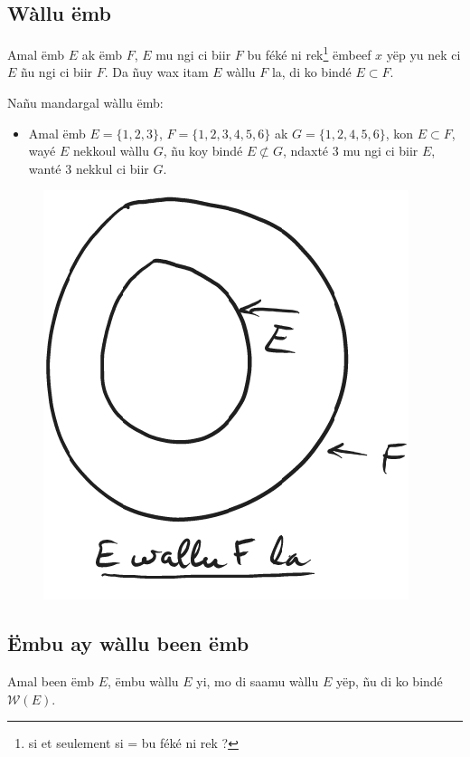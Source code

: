 \documentclass[twoside, a4paper]{article}
\begin{document}
\subsection{Wàllu ëmb}
\begin{tcolorbox}[enhanced jigsaw,breakable,pad at break*=1mm,
    colback=red!5!white,colframe=white!75!black,title= Téeki,
    watermark color=white]
  Amal ëmb $E$ ak ëmb $F$, $E$ mu ngi ci biir $F$ bu féké ni rek\footnote{si et seulement si = bu féké ni rek ?} ëmbeef $x$ yëp yu nek ci $E$ ñu ngi ci biir $F$. Da ñuy wax itam $E$ wàllu $F$ la, di ko bindé $E \subset F$.
\end{tcolorbox}

Nañu mandargal wàllu ëmb:
\begin{itemize}
  \item Amal ëmb $E=\{1,2,3\}$, $F=\{1,2,3,4,5,6\}$ ak $G = \{1,2,4,5,6\}$, kon $E \subset F$, wayé $E$ nekkoul wàllu $G$, ñu koy bindé $E\not\subset G$, ndaxté $3$ mu ngi ci biir $E$, wanté $3$ nekkul ci biir $G$.
\end{itemize}
\begin{figure}[ht]
  \centering
  \includegraphics[scale = 0.5]{image/wallu_emb.png}
  \label{fig:wallu_emb}
\end{figure}


\subsection{Ëmbu ay wàllu been ëmb}
\begin{tcolorbox}[enhanced jigsaw,breakable,pad at break*=1mm,
    colback=red!5!white,colframe=white!75!black,title= Téeki,
    watermark color=white]
  Amal been ëmb $E$, ëmbu wàllu $E$ yi, mo di saamu wàllu $E$ yëp, ñu di ko bindé $\mathcal{W}(E)$.
\end{tcolorbox}
\end{document}

